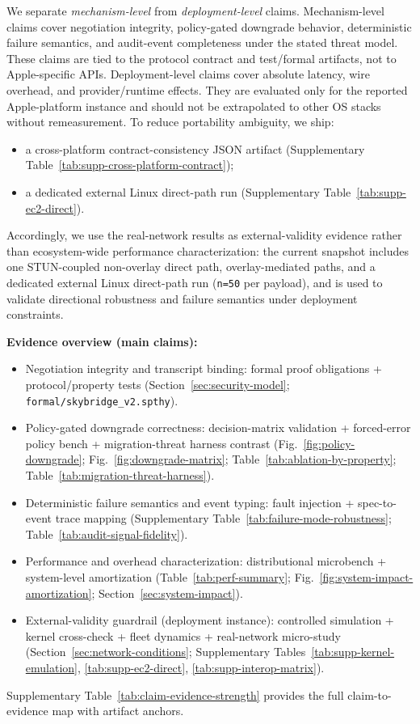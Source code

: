 \documentclass[10pt,journal,compsoc]{IEEEtran}
\providecommand{\tightlist}{%
  \setlength{\itemsep}{0pt}\setlength{\parskip}{0pt}}
\begin{document}
We separate \emph{mechanism-level} from \emph{deployment-level} claims.
Mechanism-level claims cover negotiation integrity, policy-gated
downgrade behavior, deterministic failure semantics, and audit-event
completeness under the stated threat model. These claims are tied to the
protocol contract and test/formal artifacts, not to Apple-specific APIs.
Deployment-level claims cover absolute latency, wire overhead, and
provider/runtime effects. They are evaluated only for the reported
Apple-platform instance and should not be extrapolated to other OS
stacks without remeasurement. To reduce portability ambiguity, we ship:
\begin{itemize}\tightlist
\item a cross-platform contract-consistency JSON artifact
(Supplementary Table~\ref{tab:supp-cross-platform-contract});
\item a dedicated external Linux direct-path run
(Supplementary Table~\ref{tab:supp-ec2-direct}).
\end{itemize}

Accordingly, we use the real-network results as external-validity
evidence rather than ecosystem-wide performance characterization: the
current snapshot includes one STUN-coupled non-overlay direct path,
overlay-mediated paths, and a dedicated external Linux direct-path run
(\texttt{n=50} per payload), and is used to validate directional
robustness and failure semantics under deployment constraints.

\textbf{Evidence overview (main claims):}
\begin{itemize}\tightlist
\item Negotiation integrity and transcript binding: formal proof obligations + protocol/property tests (Section~\ref{sec:security-model}; \texttt{formal/skybridge\_v2.spthy}).
\item Policy-gated downgrade correctness: decision-matrix validation + forced-error policy bench + migration-threat harness contrast (Fig.~\ref{fig:policy-downgrade}; Fig.~\ref{fig:downgrade-matrix}; Table~\ref{tab:ablation-by-property}; Table~\ref{tab:migration-threat-harness}).
\item Deterministic failure semantics and event typing: fault injection + spec-to-event trace mapping (Supplementary Table~\ref{tab:failure-mode-robustness}; Table~\ref{tab:audit-signal-fidelity}).
\item Performance and overhead characterization: distributional microbench + system-level amortization (Table~\ref{tab:perf-summary}; Fig.~\ref{fig:system-impact-amortization}; Section~\ref{sec:system-impact}).
\item External-validity guardrail (deployment instance): controlled simulation + kernel cross-check + fleet dynamics + real-network micro-study (Section~\ref{sec:network-conditions}; Supplementary Tables~\ref{tab:supp-kernel-emulation}, \ref{tab:supp-ec2-direct}, \ref{tab:supp-interop-matrix}).
\end{itemize}
Supplementary Table~\ref{tab:claim-evidence-strength} provides the full claim-to-evidence map with artifact anchors.
\end{document}
